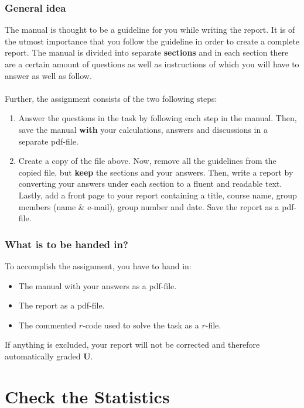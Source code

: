 \documentclass[a4paper, 10pt,serif]{article}
\begin{document}
\subsubsection*{General idea}
The manual is thought to be a guideline for you while writing the report. It is of the utmost importance that you follow the guideline in order to create a complete report. The manual is divided into separate \textbf{sections} and in each section there are a certain amount of questions as well as instructions of which you will have to answer as well as follow. 
\\
\\
\noindent
Further, the assignment consists of the two following steps: 
\begin{enumerate}
    \item Answer the questions in the task by following each step in the manual. Then, save the manual \textbf{with} your calculations, answers and discussions in a separate pdf-file.
    \item Create a copy of the file above. Now, remove all the guidelines from the copied file, but \textbf{keep} the sections and your answers. Then, write a report by converting your answers under each section to a fluent and readable text. Lastly, add a front page to your report containing a title, course name, group members (name \& e-mail), group number and date. Save the report as a pdf-file. 
\end{enumerate}

\newpage
\subsubsection*{What is to be handed in?}
To accomplish the assignment, you have to hand in:
\begin{itemize}
    \item The manual with your answers as a pdf-file.
    \item The report as a pdf-file.
    \item The commented $r$-code used to solve the task as a $r$-file.
\end{itemize}
If anything is excluded, your report will not be corrected and therefore automatically graded \textbf{U}.


\newpage
\section*{Check the Statistics}
\end{document}
